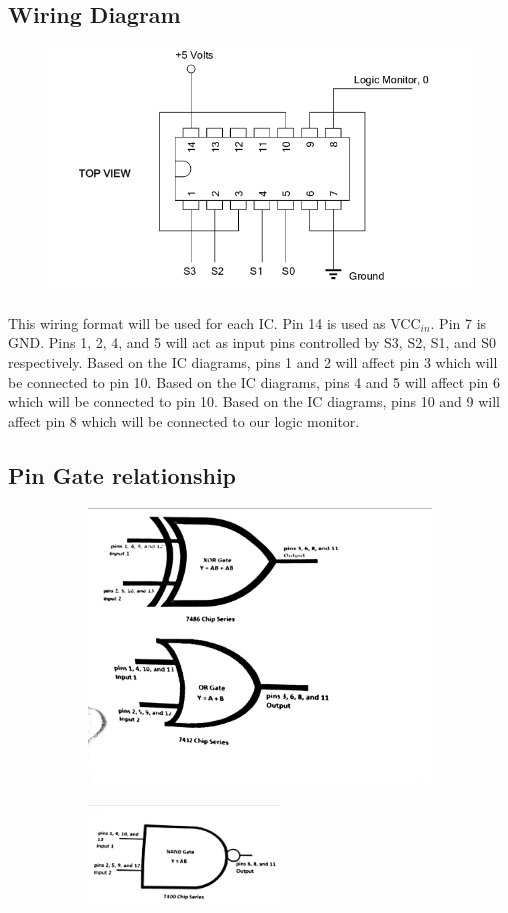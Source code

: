 \documentclass[11pt,a4paper]{article}
\begin{document}
\subsection{Wiring Diagram}
\begin{figure}[h]
    \includegraphics[width=5in]{IC-wires.png}
\end{figure}
This wiring format will be used for each IC.
Pin 14 is used as VCC$_{in}$. Pin 7 is GND.
Pins 1, 2, 4, and 5 will act as input pins controlled by S3, S2, S1, and S0 respectively.
Based on the IC diagrams, pins 1 and 2 will affect pin 3 which will be connected to pin 10.
Based on the IC diagrams, pins 4 and 5 will affect pin 6 which will be connected to pin 10.
Based on the IC diagrams, pins 10 and 9 will affect pin 8 which will be connected to our logic monitor.

\pagebreak
\subsection{Pin Gate relationship}
\begin{figure}[h!]
    \begin{subfigure}{.7\textwidth}
        \includegraphics[width=4in]{XOR_OR_gates.jpg}
    \end{subfigure}
    \begin{subfigure}{.3\textwidth}
        \includegraphics[width=2in]{NAND_gate.jpg}
    \end{subfigure}
\end{figure}
\end{document}
